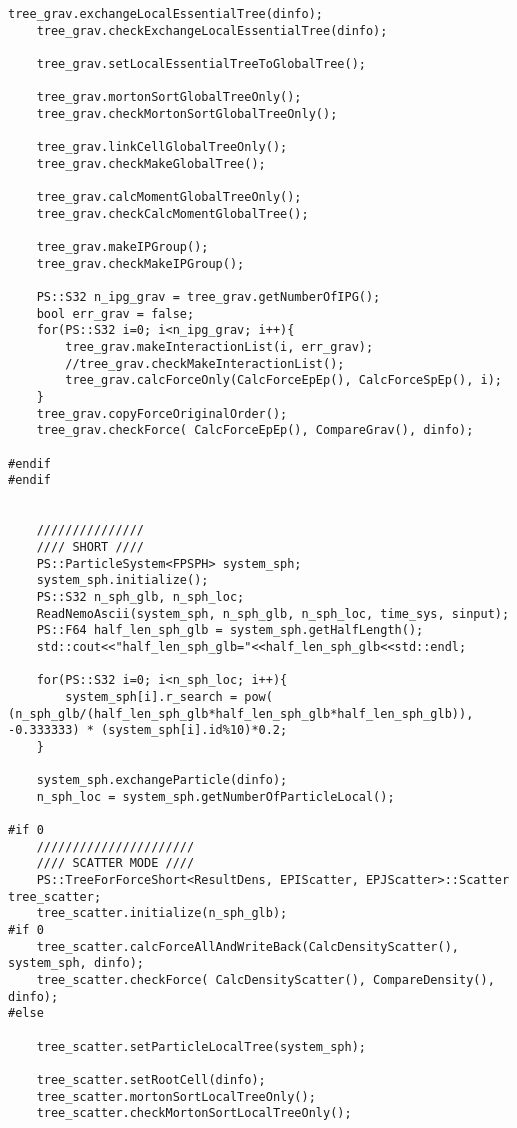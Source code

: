 \begin{lstlisting}[caption=開放境界、モートンソート、ローカルツリー構築、モーメント計算、LET交換、グローバルツリー構築、相互作用計算のテスト]
    tree_grav.exchangeLocalEssentialTree(dinfo);
    tree_grav.checkExchangeLocalEssentialTree(dinfo);

    tree_grav.setLocalEssentialTreeToGlobalTree();

    tree_grav.mortonSortGlobalTreeOnly();
    tree_grav.checkMortonSortGlobalTreeOnly();

    tree_grav.linkCellGlobalTreeOnly();
    tree_grav.checkMakeGlobalTree();

    tree_grav.calcMomentGlobalTreeOnly();
    tree_grav.checkCalcMomentGlobalTree();

    tree_grav.makeIPGroup();
    tree_grav.checkMakeIPGroup();

    PS::S32 n_ipg_grav = tree_grav.getNumberOfIPG();
    bool err_grav = false;
    for(PS::S32 i=0; i<n_ipg_grav; i++){
        tree_grav.makeInteractionList(i, err_grav);
        //tree_grav.checkMakeInteractionList();
        tree_grav.calcForceOnly(CalcForceEpEp(), CalcForceSpEp(), i);
    }
    tree_grav.copyForceOriginalOrder();
    tree_grav.checkForce( CalcForceEpEp(), CompareGrav(), dinfo);

#endif
#endif


    ///////////////
    //// SHORT ////
    PS::ParticleSystem<FPSPH> system_sph;
    system_sph.initialize();
    PS::S32 n_sph_glb, n_sph_loc;
    ReadNemoAscii(system_sph, n_sph_glb, n_sph_loc, time_sys, sinput);
    PS::F64 half_len_sph_glb = system_sph.getHalfLength();
    std::cout<<"half_len_sph_glb="<<half_len_sph_glb<<std::endl;

    for(PS::S32 i=0; i<n_sph_loc; i++){
        system_sph[i].r_search = pow( (n_sph_glb/(half_len_sph_glb*half_len_sph_glb*half_len_sph_glb)), -0.333333) * (system_sph[i].id%10)*0.2;
    }

    system_sph.exchangeParticle(dinfo);
    n_sph_loc = system_sph.getNumberOfParticleLocal();

#if 0
    //////////////////////
    //// SCATTER MODE ////
    PS::TreeForForceShort<ResultDens, EPIScatter, EPJScatter>::Scatter tree_scatter;
    tree_scatter.initialize(n_sph_glb);
#if 0
    tree_scatter.calcForceAllAndWriteBack(CalcDensityScatter(), system_sph, dinfo);
    tree_scatter.checkForce( CalcDensityScatter(), CompareDensity(), dinfo);
#else

    tree_scatter.setParticleLocalTree(system_sph);

    tree_scatter.setRootCell(dinfo);
    tree_scatter.mortonSortLocalTreeOnly();
    tree_scatter.checkMortonSortLocalTreeOnly();


\end{lstlisting}
